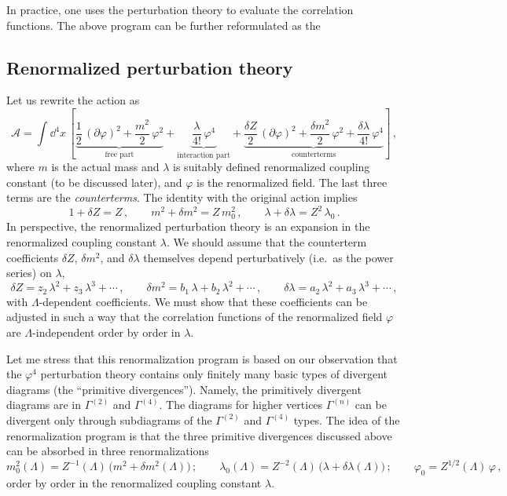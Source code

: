 In practice, one uses the perturbation theory to evaluate the correlation
functions. The above program can be further reformulated as the

\subsection*{Renormalized perturbation theory}

Let us rewrite the action as
\[
\mathcal A=\int \dd^4x\,\left[\underbrace{\frac12\,(\partial\varphi)^2+\frac{m^2}2\,\varphi^2}_{\text{free part}}
+\underbrace{\frac\lambda{4!}\,\varphi^4}_{\text{interaction part}}
+\underbrace{\frac{\delta Z}2\,(\partial\varphi)^2+\frac{\delta m^2}2\,\varphi^2+\frac{\delta\lambda}{4!}\,\varphi^4}_{\text{counterterms}}\right]\,,
\]
where $m$ is the actual mass and $\lambda$ is suitably defined renormalized
coupling constant (to be discussed later), and $\varphi$ is the renormalized
field. The last three terms are the \emph{counterterms}. The identity with the
original action implies
\[
1+\delta Z=Z\,,\qquad m^2+\delta m^2=Z\,m_0^2\,,\qquad\lambda+\delta\lambda=Z^2\,\lambda_0\,.
\]
In perspective, the renormalized perturbation theory is an expansion in the
renormalized coupling constant $\lambda$. We should assume that the
counterterm coefficients $\delta Z$, $\delta m^2$, and $\delta\lambda$
themselves depend perturbatively (i.e.\ as the power series) on $\lambda$,
\[
\delta Z=z_2\,\lambda^2+z_3\,\lambda^3+\cdots\,,\qquad
\delta m^2=b_1\,\lambda+b_2\,\lambda^2+\cdots\,,\qquad
\delta\lambda=a_2\,\lambda^2+a_3\,\lambda^3+\cdots\,,
\]
with $\Lambda$-dependent coefficients. We must show that these coefficients can
be adjusted in such a way that the correlation functions of the renormalized
field $\varphi$ are $\Lambda$-independent order by order in $\lambda$.

Let me stress that this renormalization program is based on our observation
that the $\varphi^4$ perturbation theory contains only finitely many basic
types of divergent diagrams (the ``primitive divergences''). Namely, the
primitively divergent diagrams are in $\Gamma^{(2)}$ and $\Gamma^{(4)}$. The
diagrams for higher vertices $\Gamma^{(n)}$ can be divergent only through
subdiagrams of the $\Gamma^{(2)}$ and $\Gamma^{(4)}$ types. The idea of the
renormalization program is that the three primitive divergences discussed above
can be absorbed in three renormalizations
\[
m_0^2(\Lambda)=Z^{-1}(\Lambda)\,\bigl(m^2+\delta m^2(\Lambda)\bigr)\,;\qquad
\lambda_0(\Lambda)=Z^{-2}(\Lambda)\,\bigl(\lambda+\delta\lambda(\Lambda)\bigr)\,;\qquad
\varphi_0=Z^{1/2}(\Lambda)\,\varphi\,,
\]
order by order in the renormalized coupling constant $\lambda$.

